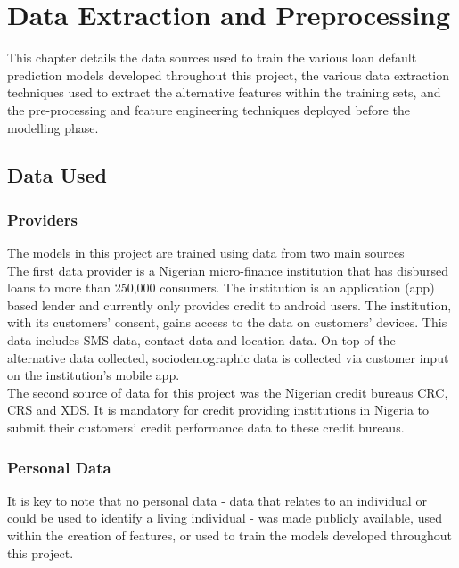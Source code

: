 \chapter{Data Extraction and Preprocessing} 
\label{Chapter3}

This chapter details the data sources used to train the various loan default prediction models developed throughout this project, the various data extraction techniques used to extract the alternative features within the training sets, and the pre-processing and feature engineering techniques deployed before the modelling phase.   

\section{Data Used}

\subsection{Providers}

The models in this project are trained using data from two main sources \\

The first data provider is a Nigerian micro-finance institution that has disbursed loans to more than 250,000 consumers. The institution is an application (app) based lender and currently only provides credit to android users. The institution, with its customers' consent, gains access to the data on customers' devices. This data includes SMS data, contact data and location data. On top of the alternative data collected, sociodemographic data is collected via customer input on the institution's mobile app. \\

The second source of data for this project was the Nigerian credit bureaus CRC, CRS and XDS. It is mandatory for credit providing institutions in Nigeria to submit their customers' credit performance data to these credit bureaus.

\subsection{Personal Data}

It is key to note that no personal data - data that relates to an individual or could be used to identify a living individual - was made publicly available, used within the creation of features, or used to train the models developed throughout this project. 

